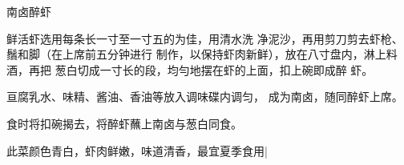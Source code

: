 \begin{recipe}{南卤醉虾}

\ingredients


\cooking

\step 鲜活虾选用每条长一寸至一寸五的为佳，用清水洗 净泥沙，再用剪刀剪去虾枪、鬚和脚（在上席前五分钟进行 制作，以保持虾肉新鲜），放在八寸盘内，淋上料酒，再把 葱白切成一寸长的段，均勻地摆在虾的上面，扣上碗即成醉 虾。

\step 亘腐乳水、味精、酱油、香油等放入调味碟内调匀， 成为南卤，随同醉虾上席。

\step 食时将扣碗揭去，将醉虾蘸上南卤与葱白同食。

\notes

此菜颜色青白，虾肉鲜嫩，味道清香，最宜夏季食用|

\end{recipe}


